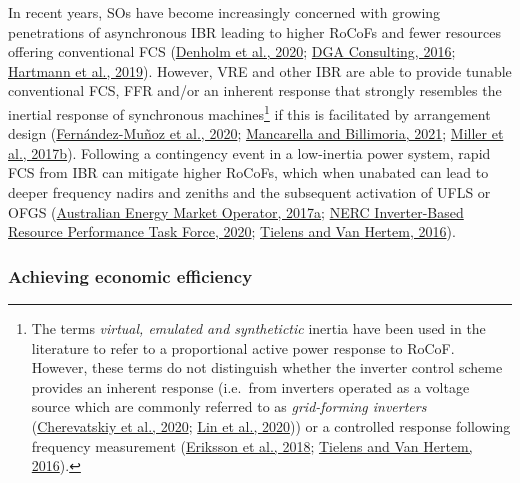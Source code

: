 \documentclass[12pt,a4paper,]{report}
\begin{document}
In recent years, SOs have become increasingly concerned with growing
penetrations of asynchronous IBR leading to higher RoCoFs and fewer
resources offering conventional FCS
(\protect\hyperlink{ref-denholmInertiaPowerGrid2020}{Denholm et al.,
2020};
\protect\hyperlink{ref-dgaconsultingInternationalReviewFrequency2016}{DGA
Consulting, 2016};
\protect\hyperlink{ref-hartmannEffectsDecreasingSynchronous2019}{Hartmann
et al., 2019}). However, VRE and other IBR are able to provide tunable
conventional FCS, FFR and/or an inherent response that strongly
resembles the inertial response of synchronous machines\footnote{The
  terms \emph{virtual, emulated and synthetictic} inertia have been used
  in the literature to refer to a proportional active power response to
  RoCoF. However, these terms do not distinguish whether the inverter
  control scheme provides an inherent response (i.e.~from inverters
  operated as a voltage source which are commonly referred to as
  \emph{grid-forming inverters}
  (\protect\hyperlink{ref-cherevatskiyGridFormingEnergy2020}{Cherevatskiy
  et al., 2020};
  \protect\hyperlink{ref-linResearchRoadmapGridForming2020}{Lin et al.,
  2020})) or a controlled response following frequency measurement
  (\protect\hyperlink{ref-erikssonSyntheticInertiaFast2018}{Eriksson et
  al., 2018};
  \protect\hyperlink{ref-tielensRelevanceInertiaPower2016}{Tielens and
  Van Hertem, 2016}).} if this is facilitated by arrangement design
(\protect\hyperlink{ref-fernandez-munozFastFrequencyControl2020}{Fernández-Muñoz
et al., 2020};
\protect\hyperlink{ref-mancarellaFragileGridPhysics2021}{Mancarella and
Billimoria, 2021};
\protect\hyperlink{ref-millerTechnologyCapabilitiesFast2017}{Miller et
al., 2017b}). Following a contingency event in a low-inertia power
system, rapid FCS from IBR can mitigate higher RoCoFs, which when
unabated can lead to deeper frequency nadirs and zeniths and the
subsequent activation of UFLS or OFGS
(\protect\hyperlink{ref-australianenergymarketoperatorFastFrequencyResponse2017}{Australian
Energy Market Operator, 2017a};
\protect\hyperlink{ref-nercinverter-basedresourceperformancetaskforceFastFrequencyResponse2020}{NERC
Inverter-Based Resource Performance Task Force, 2020};
\protect\hyperlink{ref-tielensRelevanceInertiaPower2016}{Tielens and Van
Hertem, 2016}).

\hypertarget{sec:fcs-efficiency-challenges}{%
\subsubsection{Achieving economic
efficiency}\label{sec:fcs-efficiency-challenges}}
\end{document}
